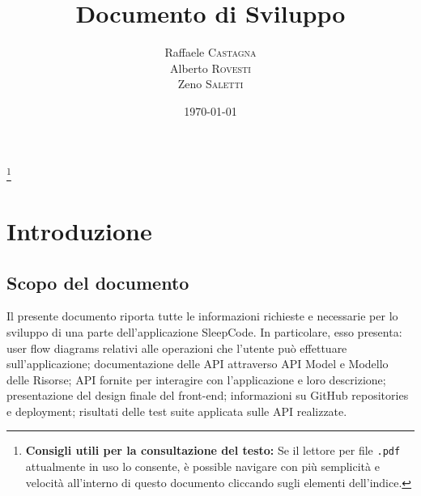 \documentclass[11pt, a4paper]{article}
\title{Documento di Sviluppo}
\author{Raffaele \textsc{Castagna}\\
Alberto \textsc{Rovesti}\\
Zeno \textsc{Saletti}}
\date{\today}
\theoremstyle{definition}
\newcommand\blfootnote[1]{%
  \begingroup
  \renewcommand\thefootnote{}\footnote{#1}%
  \addtocounter{footnote}{-1}%
  \endgroup
}
\begin{document}


\tableofcontents\blfootnote{\textbf{Consigli utili per la consultazione del testo:} Se il lettore per file \texttt{.pdf} attualmente in uso lo consente, è possible navigare con più semplicità e velocità all'interno di questo documento cliccando sugli elementi dell'indice.}

\newpage
\section{Introduzione}
\subsection{Scopo del documento}
Il presente documento riporta tutte le informazioni richieste e necessarie per lo sviluppo
di una parte dell'applicazione SleepCode. In particolare, esso presenta:
user flow diagrams relativi alle operazioni che l'utente può effettuare sull'applicazione;
documentazione delle API attraverso API Model e Modello delle Risorse;
API fornite per interagire con l'applicazione e loro descrizione;
presentazione del design finale del front-end;
informazioni su GitHub repositories e deployment;
risultati delle test suite applicata sulle API realizzate.


\end{document}
